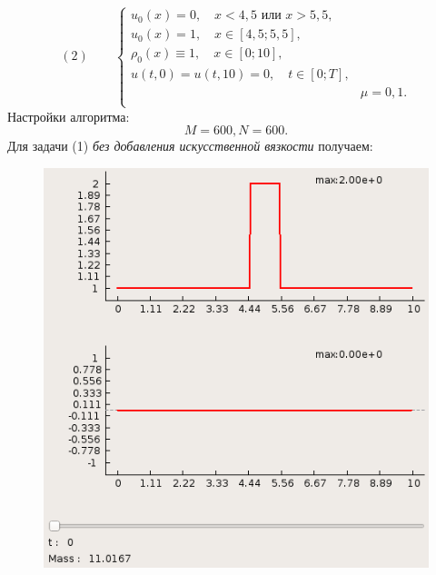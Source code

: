 \documentclass[a4paper, 11pt]{article}
\begin{document}
$$
(2)\quad \quad
\begin{cases}
u_0(x) = 0, \quad x < 4,5 \text{ или } x > 5,5,\\
u_0(x) = 1, \quad x \in [4,5; 5,5],\\
\rho_0(x) \equiv 1, \quad x \in [0; 10],\\
u(t, 0) = u(t, 10) = 0, \quad t \in [0; T],\\
& \mu =  0,1. \\
\end{cases}
$$
Настройки алгоритма:
$$
M = 600,
N = 600.
$$
Для задачи (1) \textit{без добавления искусственной вязкости} получаем:
\begin{figure}[H]
	\begin{minipage}[H] {0.49\linewidth}
		\includegraphics[width=1\linewidth]{p1/p1_t=0.png}
	\end{minipage}%
	\begin{minipage}[H] {0.49\linewidth}

\end{minipage}
\end{figure}
\end{document}
